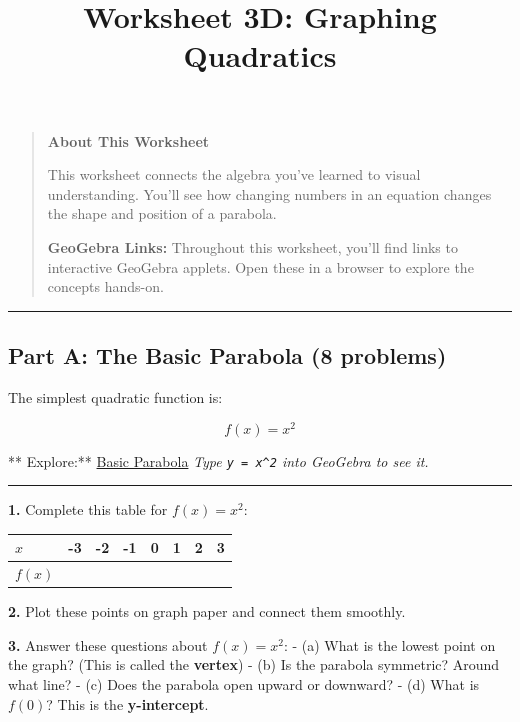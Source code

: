 \documentclass[
  11pt,
]{article}
\title{Worksheet 3D: Graphing Quadratics}
\author{}
\date{}
\begin{document}
\maketitle

\begin{quote}
\textbf{About This Worksheet}

This worksheet connects the algebra you've learned to visual
understanding. You'll see how changing numbers in an equation changes
the shape and position of a parabola.

\textbf{GeoGebra Links:} Throughout this worksheet, you'll find links to
interactive GeoGebra applets. Open these in a browser to explore the
concepts hands-on.
\end{quote}

\begin{center}\rule{0.5\linewidth}{0.5pt}\end{center}

\hypertarget{part-a-the-basic-parabola-8-problems}{%
\subsection{Part A: The Basic Parabola (8
problems)}\label{part-a-the-basic-parabola-8-problems}}

The simplest quadratic function is:

\[f(x) = x^2\]

** Explore:** \href{https://www.geogebra.org/calculator}{Basic Parabola}
\emph{Type \texttt{y\ =\ x\^{}2} into GeoGebra to see it.}

\begin{center}\rule{0.5\linewidth}{0.5pt}\end{center}

\textbf{1.} Complete this table for \(f(x) = x^2\):

\begin{longtable}[]{@{}llllllll@{}}
\toprule\noalign{}
\(x\) & -3 & -2 & -1 & 0 & 1 & 2 & 3 \\
\midrule\noalign{}
\endhead
\bottomrule\noalign{}
\endlastfoot
\(f(x)\) & & & & & & & \\
\end{longtable}

\textbf{2.} Plot these points on graph paper and connect them smoothly.

\textbf{3.} Answer these questions about \(f(x) = x^2\): - (a) What is
the lowest point on the graph? (This is called the \textbf{vertex}) -
(b) Is the parabola symmetric? Around what line? - (c) Does the parabola
open upward or downward? - (d) What is \(f(0)\)? This is the
\textbf{y-intercept}.
\end{document}
